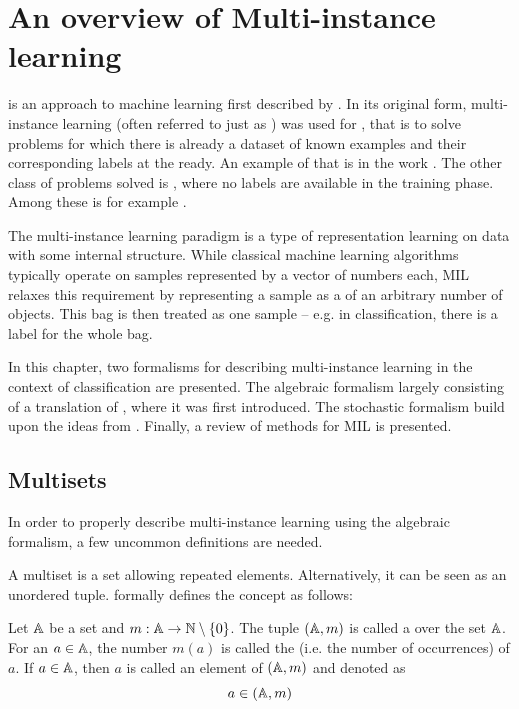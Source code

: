 \chapter{An overview of Multi-instance learning}\label{chap:MIL}

 is an approach to machine learning first described by \cite{dietterich_solving_1997}. In its original form, multi-instance learning (often referred to just as ) was used for , that is to solve problems for which there is already a dataset of known examples and their corresponding labels at the ready. An example of that is in the work \cite{amores_multiple_2013}. The other class of problems solved is , where no labels are available in the training phase. Among these is for example \cite{chen_contextual_2012}.

The multi-instance learning paradigm is a type of representation learning on data with some internal structure. While classical machine learning algorithms typically operate on samples represented by a vector of numbers each, MIL relaxes this requirement by representing a sample as a  of an arbitrary number of objects. This bag is then treated as one sample -- e.g. in classification, there is a label for the whole bag.

In this chapter, two formalisms for describing multi-instance learning in the context of classification are presented. The algebraic formalism largely consisting of a translation of \cite{dedic_hierarchicke_2017}, where it was first introduced. The stochastic formalism build upon the ideas from \cite{muandet_learning_2012}. Finally, a review of methods for MIL is presented.

\section{Multisets}

In order to properly describe multi-instance learning using the algebraic formalism, a few uncommon definitions are needed.

A multiset is a set allowing repeated elements. Alternatively, it can be seen as an unordered tuple. \cite{knuth_art_1968} formally defines the concept as follows:

\begin{define}
	Let \( \mathbb{A} \) be a set and \( m : \mathbb{A} \to \mathbb{N} \setminus \left\{ 0 \right\} \). The tuple \( \left( \mathbb{A}, m \right) \) is called a  over the set \( \mathbb{A} \). For an \( a \in \mathbb{A} \), the number \( m \left( a \right) \) is called the  (i.e. the number of occurrences) of \( a \). If \( a \in \mathbb{A} \), then \( a \) is called an element of \( \left( \mathbb{A}, m \right) \) and denoted as
	\[ a \in \left( \mathbb{A}, m \right) \]
\end{define}

